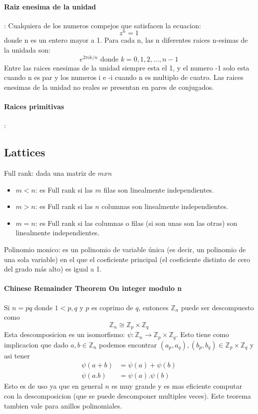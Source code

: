 \documentclass[12pt, oneside]{article}
\newcommand{\Z}{\mathbb{Z}}
\begin{document}
\paragraph{Raiz enesima de la unidad}:
Cualquiera de los numeros compejos que satisfacen la ecuacion:
\begin{equation*}
  z^n=1
\end{equation*}
donde n es un entero mayor a 1.
Para cada n, las n diferentes raices n-esimas de la unidada son:
\begin{equation*}
  e^{2\pi ik/n} \text{ donde } k=0,1,2,...,n-1
\end{equation*}
Entre las raices enesimas de la unidad siempre esta el 1, y el numero -1 solo
esta cuando n es par y los numeros i e -i cuando n es multiplo de cuatro.
Las raices enesimas de la unidad no reales se presentan en pares de conjugados.

\vspace{0.3cm}
\paragraph{Raices primitivas}:

\subsection{Lattices}

Full rank: dada una matriz de $m x n$
\begin{itemize}
  \item $m<n$: es Full rank si las $m$ filas son linealmente independientes.
  \item $m>n$: es Full rank si las $n$ columnas son linealmente independientes.
  \item $m=n$: es Full rank si las columnas o filas (si son unas son las otras) son
    linealmente independientes.
\end{itemize}

Polinomio monico:
es un polinomio de variable única (es decir, un polinomio de una sola variable)
en el que el coeficiente principal (el coeficiente distinto de cero del grado más alto) es igual a 1.

\paragraph{Chinese Remainder Theorem On integer modulo n}
Si $n=pq$  donde $1<p,q$ y $p$ es coprimo de $q$, entonces $\Z_n$ puede ser descompuesto como
\begin{equation*}
  \Z_n \cong \Z_p\times \Z_q
\end{equation*}
Esta descomposicion es un isomorfismo: $\psi:\Z_n\to\Z_p\times\Z_q$.
Esto tiene como implicacion que dado $a,b \in\Z_n$ podemos encontrar $(a_p,a_q),(b_p,b_q)\in\Z_p\times\Z_q$
y asi tener
\begin{align}
  \psi(a+b)&=\psi(a)+\psi(b)\\
  \psi(a.b)&=\psi(a).\psi(b)
\end{align}
Esto es de uso ya que en general $n$ es muy grande y es mas eficiente
computar con la descomposicion (que se puede descomponer multiples veces).
Este teorema tambien vale para anillos polinomiales.
\end{document}
